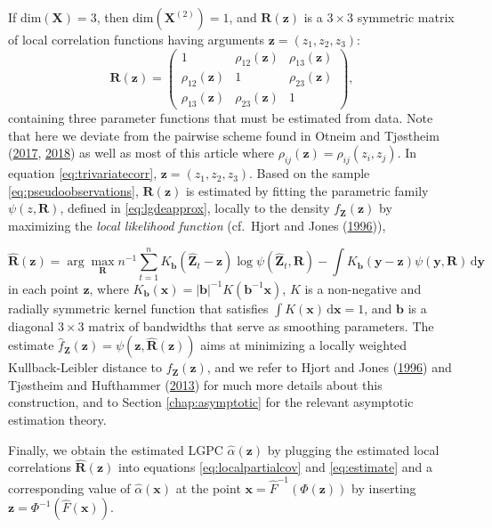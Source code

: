 \documentclass[
  12pt,
  letterpaper]{article}
\newcommand{\X}{\bm{X}}
\newcommand{\Xtwo}{\bm{X}^{(2)}}
\newcommand{\x}{\bm{x}}
\newcommand{\Z}{\bm{Z}}
\newcommand{\z}{\bm{z}}
\newcommand{\hZ}{\widehat{\bm{Z}}}
\newcommand{\y}{\bm{y}}
\newcommand{\R}{\bm{R}}
\newcommand{\hR}{\widehat{\bm{R}}}
\newcommand{\hf}{\widehat{f}}
\newcommand{\hh}{\bm{b}}
\newcommand{\halpha}{\widehat{\alpha}}
\theoremstyle{definition}
\theoremstyle{definition}
\theoremstyle{definition}
\theoremstyle{remark}
\begin{document}
If dim\((\X) = 3\), then dim\((\Xtwo)=1\), and \(\R(\z)\) is a \(3\times3\) symmetric matrix of local correlation functions having arguments \(\z = (z_1,z_2,z_3)\):
\begin{equation}
\R(\z) = \begin{pmatrix} 1 & \rho_{12}(\z) & \rho_{13}(\z) \\ \rho_{12}(\z) & 1 & \rho_{23}(\z) \\ \rho_{13}(\z) & \rho_{23}(\z) & 1\end{pmatrix},
\label{eq:trivariatecorr}
\end{equation}
containing three parameter functions that must be estimated from data. Note that here we deviate from the pairwise scheme found in Otneim and Tjøstheim (\protect\hyperlink{ref-otneim2017locally}{2017}, \protect\hyperlink{ref-otneim2017conditional}{2018}) as well as most of this article where \(\rho_{ij}(\z) = \rho_{ij}(z_i, z_j)\). In equation \eqref{eq:trivariatecorr}, \(\z = (z_1,z_2,z_3)\). Based on the sample \eqref{eq:pseudoobservations}, \(\R(\z)\) is estimated by fitting the parametric family \(\psi(z, \R)\), defined in \eqref{eq:lgdeapprox}, locally to the density \(f_{\Z}(\z)\) by maximizing the \emph{local likelihood function} (cf.~Hjort and Jones (\protect\hyperlink{ref-hjort1996locally}{1996})),

\begin{equation}
\hR(\z) = \arg\max_{\R} n^{-1} \sum_{t=1}^nK_{\hh}(\hZ_t - \z)\log\psi(\hZ_t, \R) - \int K_{\hh}(\y - \z)\psi(\y, \R)\,\textrm{d}\y
\label{eq:locallik3}
\end{equation}
in each point \(\z\), where \(K_{\hh}(\x) = |\hh|^{-1}K(\hh^{-1}\x)\), \(K\) is a non-negative and radially symmetric kernel function that satisfies \(\int K(\x)\,\textrm{d}\x=1\), and \(\hh\) is a diagonal \(3\times3\) matrix of bandwidths that serve as smoothing parameters. The estimate \(\hf_{\Z}(\z) = \psi(\z, \hR(\z))\) aims at minimizing a locally weighted Kullback-Leibler distance to \(f_{\Z}(\z)\), and we refer to Hjort and Jones (\protect\hyperlink{ref-hjort1996locally}{1996}) and Tjøstheim and Hufthammer (\protect\hyperlink{ref-tjostheim2013local}{2013}) for much more details about this construction, and to Section \ref{chap:asymptotic} for the relevant asymptotic estimation theory.

Finally, we obtain the estimated LGPC \(\halpha(\z)\) by plugging the estimated local correlations \(\hR(\z)\) into equations \eqref{eq:localpartialcov} and \eqref{eq:estimate} and a corresponding value of \(\halpha(\x)\) at the point \(\x = \widehat F^{-1}(\Phi(\z))\) by inserting \(\z = \Phi^{-1}({\widehat F(\x)})\).
\end{document}
